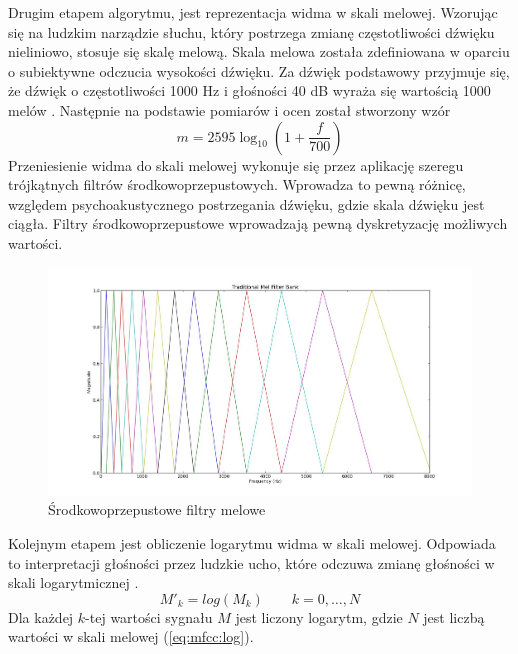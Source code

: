 \documentclass[a4paper,12pt,twoside,openany]{report}
\newcommand{\Eq}[1]{(\ref{#1})}
\begin{document}
Drugim etapem algorytmu, jest reprezentacja widma w skali melowej. 
Wzorując się na ludzkim narządzie słuchu, 
który postrzega zmianę częstotliwości dźwięku nieliniowo, stosuje się skalę melową.
Skala melowa została zdefiniowana w oparciu o subiektywne odczucia wysokości dźwięku.
Za dźwięk podstawowy przyjmuje się, że dźwięk o częstotliwości 1000 Hz i głośności 40 dB wyraża się wartością 1000 melów \cite{KrishnaKishore2013}.
Następnie na podstawie pomiarów i ocen został stworzony wzór
\begin{equation}
	m=2595\log _{10}\left(1+{\frac {f}{700}}\right)
\end{equation}
Przeniesienie widma do skali melowej wykonuje się przez aplikację szeregu trójkątnych filtrów środkowoprzepustowych. 
Wprowadza to pewną różnicę, względem psychoakustycznego postrzegania dźwięku, gdzie skala dźwięku jest ciągła.
Filtry środkowoprzepustowe wprowadzają pewną dyskretyzację możliwych wartości.
\begin{figure}[h]
	\centering
	\includegraphics[width=\textwidth]{melfilterbank}
	\caption{Środkowoprzepustowe filtry melowe}
	\label{rys:mfcc:melfilterbank}
\end{figure}

Kolejnym etapem jest obliczenie logarytmu widma w skali melowej.
Odpowiada to interpretacji głośności przez ludzkie ucho,
które odczuwa zmianę głośności w skali logarytmicznej \cite{Hossan2013}.
\begin{equation}
	M'_k=log(M_k)\qquad k=0, \dots, N
	\label{eq:mfcc:log}
\end{equation}
Dla każdej $k$-tej wartości sygnału $M$ jest liczony logarytm, gdzie $N$ jest liczbą wartości w skali melowej \Eq{eq:mfcc:log}.
\end{document}
